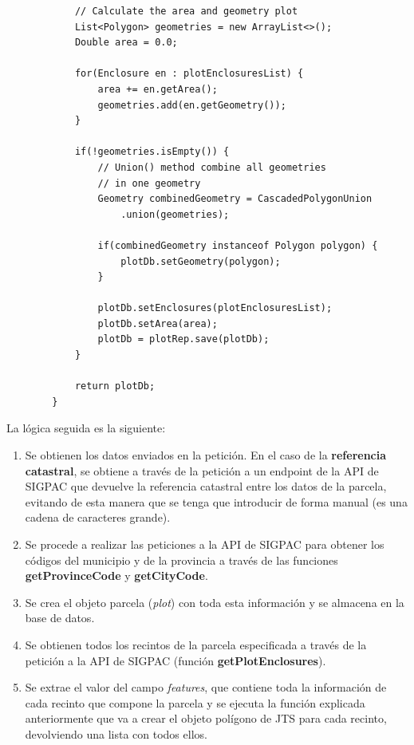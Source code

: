 \begin{itemize}
\begin{verbatim}
            // Calculate the area and geometry plot
            List<Polygon> geometries = new ArrayList<>();
            Double area = 0.0;

            for(Enclosure en : plotEnclosuresList) {
                area += en.getArea();
                geometries.add(en.getGeometry());
            }

            if(!geometries.isEmpty()) {
                // Union() method combine all geometries 
                // in one geometry
                Geometry combinedGeometry = CascadedPolygonUnion
                    .union(geometries);
                
                if(combinedGeometry instanceof Polygon polygon) {
                    plotDb.setGeometry(polygon);
                }
                
                plotDb.setEnclosures(plotEnclosuresList);
                plotDb.setArea(area);
                plotDb = plotRep.save(plotDb);
            }

            return plotDb;
        }
    \end{verbatim}

    La lógica seguida es la siguiente:

    \begin{enumerate}
        \item Se obtienen los datos enviados en la petición. En el caso de la \textbf{referencia catastral}, se obtiene a través de la petición a un endpoint de la API de SIGPAC
        que devuelve la referencia catastral entre los datos de la parcela, evitando de esta manera que se tenga que introducir de forma manual (es una cadena de caracteres
        grande).
        
        \item Se procede a realizar las peticiones a la API de SIGPAC para obtener los códigos del municipio y de la provincia a través de las funciones
        \textbf{getProvinceCode} y \textbf{getCityCode}.
        
        \item Se crea el objeto parcela (\textit{plot}) con toda esta información y se almacena en la base de datos.
        
        \item Se obtienen todos los recintos de la parcela especificada a través de la petición a la API de SIGPAC (función \textbf{getPlotEnclosures}).
        
        \item Se extrae el valor del campo \textit{features}, que contiene toda la información de cada recinto que compone la parcela y se ejecuta la función 
        explicada anteriormente que va a crear el objeto polígono de JTS para cada recinto, devolviendo una lista con todos ellos.


\end{enumerate}
\end{itemize}
